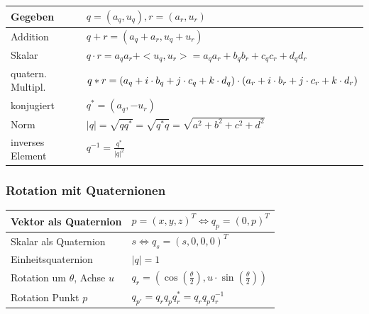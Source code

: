 \documentclass[8pt,a4paper,landscape]{scrartcl}
\begin{document}
\begin{multicols*}{3}
\begin{tabularx}{\columnwidth}{m{}|>{\raggedright\arraybackslash}X}
	Gegeben & $ q = (a_q, u_q), r=(a_r, u_r) $\\ \hline
	Addition & $ q + r = (a_q + a_r, u_q + u_r) $\\ \hline
	Skalar & $ q \cdot r = a_qa_r + <u_q, u_r> = a_qa_r + b_qb_r + c_qc_r +d_qd_r $\\ \hline
	quatern. Multipl. & $  q*r = \newline (a_q+i\cdot b_q + j\cdot c_q + k\cdot d_q)\cdot (a_r + i\cdot b_r + j\cdot c_r + k\cdot d_r) $\\ \hline
	konjugiert & $ q^{*} = (a_q, -u_r) $\\ \hline
	Norm & $ |q| = \sqrt{qq^{*}} = \sqrt{q^{*}q} = \sqrt{a^2+b^2+c^2+d^2} $\\ \hline
	inverses Element & $ q^{-1} = \frac{q^{*}}{|q|^2}$
\end{tabularx}

\subsubsection*{Rotation mit Quaternionen}
\begin{tabularx}{\columnwidth}{l|X}
	Vektor als Quaternion & $ p = (x,y,z)^T \Leftrightarrow q_p = (0, p)^T $\\ \hline
	Skalar als Quaternion & $ s \Leftrightarrow q_s = (s, 0, 0, 0)^T $\\ \hline
	Einheitsquaternion & $ |q| = 1 $\\ \hline
	Rotation um $ \theta $, Achse $ u $ & $ q_r = (\cos(\frac{\theta}{2}), u\cdot\sin(\frac{\theta}{2})) $\\ \hline
	Rotation Punkt $ p $ & $ q_{p'} = q_rq_pq_r^{*} = q_rq_pq_r^{-1} $
\end{tabularx}


\end{multicols*}
\end{document}
